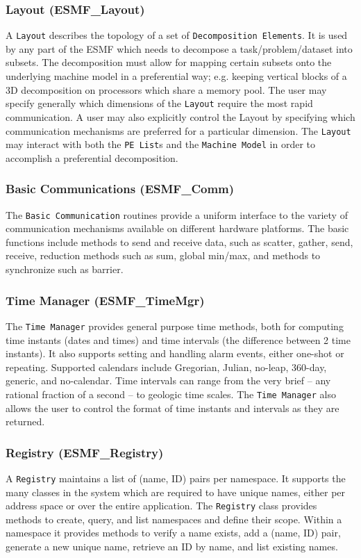 \subsubsection{Layout (ESMF\_Layout)}
\label{sec:layout} 
A {\tt Layout} describes the topology of a set of {\tt Decomposition 
Elements}.
It is used by any part of the ESMF which needs
to decompose a task/problem/dataset into subsets.
The decomposition must allow for mapping certain subsets onto the
underlying machine model in a preferential way; e.g. keeping
vertical blocks of a 3D decomposition on processors which share
a memory pool.  The user may specify generally which 
dimensions of the {\tt Layout} require the most rapid communication.
A user may also explicitly control the {Layout} by specifying which 
communication mechanisms are preferred for a particular dimension.
The {\tt Layout} may interact with both the {\tt PE List}s
and the {\tt Machine Model} in order to accomplish a preferential
decomposition.

\subsubsection{Basic Communications (ESMF\_Comm)}
\label{sec:basiccomm} 
The {\tt Basic Communication} routines provide a uniform 
interface to the variety of communication mechanisms available
on different hardware platforms.  
The basic functions include methods to send
and receive data, such as scatter, gather, send, receive,
reduction methods such as sum, global min/max, and methods
to synchronize such as barrier. 

\subsubsection{Time Manager (ESMF\_TimeMgr)}
\label{sec:timemgr} 
The {\tt Time Manager} provides general purpose time methods, both
for computing time instants (dates and times) and time intervals
(the difference between 2 time instants).   It also supports 
setting and handling alarm events, either one-shot or repeating.
Supported calendars include Gregorian, Julian, no-leap, 360-day, 
generic, and no-calendar.
Time intervals can range from the very brief -- any rational fraction
of a second -- to geologic time scales.
The {\tt Time Manager} also allows the user to control the format of
time instants and intervals as they are returned.

\subsubsection{Registry (ESMF\_Registry)}
\label{sec:registry} 
A {\tt Registry} maintains a list of (name, ID) pairs per 
namespace.  It supports the many classes in the system which are
required to have unique names, either per address space or over the entire
application.  The {\tt Registry} class provides methods to
create, query, and list namespaces and define their scope.  
Within a namespace it provides methods to
verify a name exists, add a (name, ID) pair,
generate a new unique name, retrieve an ID by name, 
and list existing names.

